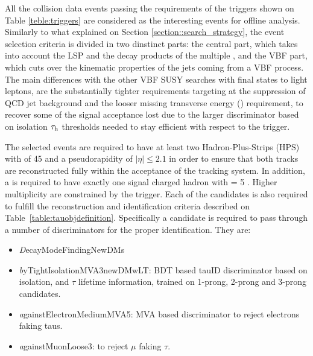 All the collision data events passing the requirements of the triggers shown on Table \ref{teble:triggers} are considered as the interesting events for offline analysis.
Similarly to what explained on Section \ref{section::search_strategy}, the event selection criteria is divided in two dinstinct parts: the central part, which takes into account the LSP and the decay products of the multiple \hadtau, and the VBF part, which cuts over the kinematic properties of the jets coming from a VBF process.
The main differences with the other VBF SUSY searches with final states to light leptons, are the substantially tighter \hadtau requirements targeting at the suppression of QCD jet background and the looser missing transverse energy (\met) requirement, to recover some of the signal acceptance lost due to the larger discriminator based on isolation
$\tau_{\text{h}}$ \pt thresholds needed to stay efficient with respect to the trigger.  

The selected events are required to have at least two Hadron-Plus-Strips (HPS) \hadtau with \pt of 45 \gev and a pseudorapidity of $|\eta| \le 2.1$ in order to ensure that both tracks are reconstructed fully within the acceptance of the tracking system. In addition, a \hadtau is required to have exactly one signal charged hadron with \pt = 5 \gev. Higher multiplicity \hadtau are constrained by the trigger. Each of the \hadtau candidates is also required to fulfill the reconstruction and identification criteria described on Table~\ref{table:tauobjdefinition}. Specifically a \hadtau candidate is required to pass through a number of discriminators for the proper identification. They are:

\begin{itemize}
	
\item {\textit DecayModeFindingNewDMs} 
\item {\textit byTightIsolationMVA3newDMwLT}: BDT based tauID discriminator based on isolation, \pt and $\tau$ lifetime information, trained on 1-prong, 2-prong and 3-prong \hadtau candidates. 
\item {\textit againstElectronMediumMVA5}: MVA based discriminator to reject electrons faking taus. 
\item {\textit againstMuonLoose3}: to reject $\mu$ faking $\tau$. 

\end{itemize}


